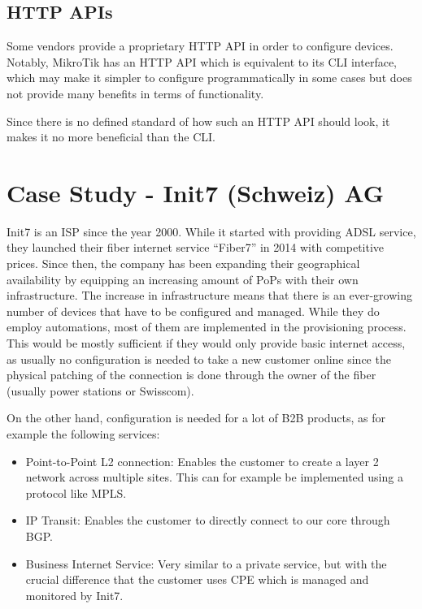 \subsection{HTTP APIs}

Some vendors provide a proprietary HTTP API in order to configure devices.
Notably, MikroTik has an HTTP API which is equivalent to its CLI interface,
which may make it simpler to configure programmatically in some cases but
does not provide many benefits in terms of functionality.

Since there is no defined standard of how such an HTTP API should look,
it makes it no more beneficial than the CLI. 

\section{Case Study - Init7 (Schweiz) AG}

Init7 is an \acrshort{ISP} since the year 2000. While it started with providing \acrshort{ADSL} service, they launched their fiber internet service
``Fiber7'' in 2014 with competitive prices. Since then, the company has been expanding their geographical availability by
equipping an increasing amount of PoPs with their own infrastructure. The increase in infrastructure means that there is
an ever-growing number of devices that have to be configured and managed. While they do employ automations, most of them
are implemented in the provisioning process. This would be mostly sufficient if they would only provide basic internet access,
as usually no configuration is needed to take a new customer online since the physical patching of the connection is done through
the owner of the fiber (usually power stations or Swisscom).

On the other hand, configuration is needed for a lot of \acrfull{B2B} products, as for example the following services:
\begin{itemize}
    \item Point-to-Point L2 connection: Enables the customer to create a layer 2 network across multiple sites.
      This can for example be implemented using a protocol like \acrshort{MPLS}.
    \item IP Transit: Enables the customer to directly connect to our core through \acrshort{BGP}.
    \item Business Internet Service: Very similar to a private service, but with the crucial difference that the customer
       uses \acrfull{CPE} which is managed and monitored by Init7.
\end{itemize}

